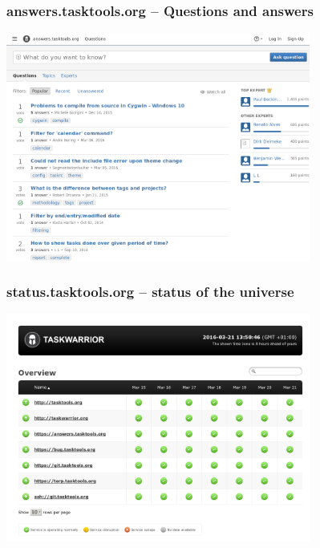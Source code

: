 \documentclass[t,handout]{beamer}
\begin{document}
\begin{frame}\frametitle{answers.tasktools.org -- Questions and answers}
    \begin{center}
        \href{http://answers.tasktools.org/}{\includegraphics[width=10cm,height=7.5cm]{answers-tasktools-org.png}}
    \end{center}
\end{frame}

\begin{frame}\frametitle{status.tasktools.org -- status of the universe}
    \begin{center}
        \href{http://status.tasktools.org/}{\includegraphics[width=10cm,height=7.5cm]{status-tasktools-org.png}}
    \end{center}
\end{frame}
\end{document}
